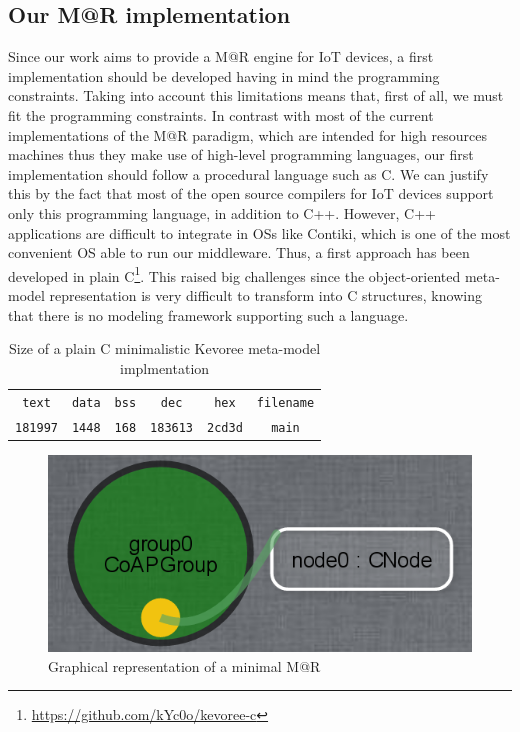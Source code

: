 \subsection{Our M@R implementation}
\label{subsec:MARImpl}
Since our work aims to provide a M@R engine for IoT devices, a first implementation should be developed having in mind the programming constraints.
Taking into account this limitations means that, first of all, we must fit the programming constraints.
In contrast with most of the current implementations of the M@R paradigm, which are intended for high resources machines thus they make use of high-level programming languages, our first implementation should follow a procedural language such as C.
We can justify this by the fact that most of the open source compilers for IoT devices support only this programming language, in addition to C++.
However, C++ applications are difficult to integrate in OSs like Contiki, which is one of the most convenient OS able to run our middleware.
Thus, a first approach has been developed in plain C\footnote{\url{https://github.com/kYc0o/kevoree-c}}.
This raised big challenges since the object-oriented meta-model representation is very difficult to transform into C structures, knowing that there is no modeling framework supporting such a language.

\begin{table}[]
	\centering
	\caption{Size of a plain C minimalistic Kevoree meta-model implmentation}
	\label{tab:kevoreeC}
	\begin{tabular}{cccccc}
		\texttt{text}   & \texttt{data} & \texttt{bss} & \texttt{dec}    & \texttt{hex}   & \texttt{filename} \\
		\texttt{181997} & \texttt{1448} & \texttt{168} & \texttt{183613} & \texttt{2cd3d} & \texttt{main}        
	\end{tabular}
\end{table}

\begin{figure}[]
	\centering
	\includegraphics[width=0.55\columnwidth]{chapters/modelsAtRuntimeContiki.images/1stModel.png}
	\caption{Graphical representation of a minimal M@R}
	\label{fig:1stModelC}
\end{figure}

